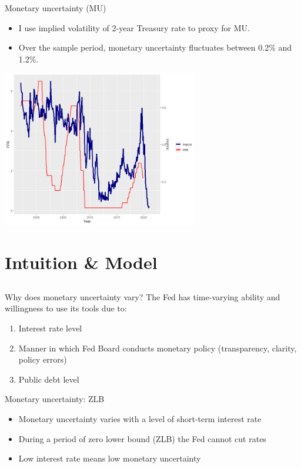\documentclass{beamer}
\begin{document}
\begin{frame}{Monetary uncertainty (MU)}
\begin{itemize}
    \item {I use implied volatility of 2-year Treasury rate to proxy for MU.}
    \item {Over the sample period, monetary uncertainty fluctuates between 0.2\% and 1.2\%.}
\end{itemize}
\centering
\includegraphics[width=0.64\textwidth]{images/imvol_ffr_plot.png}
\end{frame}



\section{Intuition \& Model}
\subsection{}

\begin{frame}{Why does monetary uncertainty vary?}
The Fed has time-varying ability and willingness to use its tools due to:
\begin{enumerate}
    \item Interest rate level
    \item Manner in which Fed Board conducts monetary policy (transparency, clarity, policy errors)
    \item Public debt level
\end{enumerate}
\end{frame}



\begin{frame}{Monetary uncertainty: ZLB}
    \begin{itemize}
        \item Monetary uncertainty varies with a level of short-term interest rate
        \item During a period of zero lower bound (ZLB) the Fed cannot cut rates
        \item Low interest rate means low monetary uncertainty
    \end{itemize}  
\end{frame}
\end{document}
